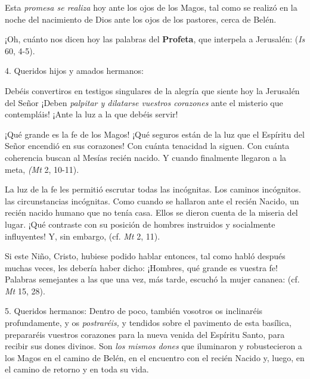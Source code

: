 \begin{body}
					Esta \emph{promesa se realiza} hoy ante los ojos de los Magos, tal como se realizó en la noche del nacimiento de Dios ante los ojos de los pastores, cerca de Belén.
					
					¡Oh, cuánto nos dicen hoy las palabras del \textbf{Profeta}, que interpela a Jerusalén:  (\emph{Is} 60, 4-5).
					
					4. Queridos hijos y amados hermanos:
					
					Debéis convertiros en testigos singulares de la alegría que siente hoy la Jerusalén del Señor ¡Deben \emph{palpitar y dilatarse vuestros corazones} ante el misterio que contempláis! ¡Ante la luz a la que debéis servir!
					
					¡Qué grande es la fe de los Magos! ¡Qué seguros están de la luz que el Espíritu del Señor encendió en sus corazones! Con cuánta tenacidad la siguen. Con cuánta coherencia buscan al Mesías recién nacido. Y cuando finalmente llegaron a la meta,  \emph{(Mt} 2, 10-11).
					
					La luz de la fe les permitió escrutar todas las incógnitas. Los caminos incógnitos. las circunstancias incógnitas. Como cuando se hallaron ante el recién Nacido, un recién nacido humano que no tenía casa. Ellos se dieron cuenta de la miseria del lugar. ¡Qué contraste con su posición de hombres instruidos y socialmente influyentes! Y, sin embargo,  (cf. \emph{Mt} 2, 11).
					
					Si este Niño, Cristo, hubiese podido hablar entonces, tal como habló después muchas veces, les debería haber dicho: ¡Hombres, qué grande es vuestra fe! Palabras semejantes a las que una vez, más tarde, escuchó la mujer cananea:  (cf. \emph{Mt} 15, 28).
					
					5. Queridos hermanos: Dentro de poco, también vosotros os inclinaréis profundamente, y os \emph{postraréis,} y tendidos sobre el pavimento de esta basílica, prepararéis vuestros corazones para la nueva venida del Espíritu Santo, para recibir sus dones divinos. Son \emph{los mismos dones} que iluminaron y robustecieron a los Magos en el camino de Belén, en el encuentro con el recién Nacido y, luego, en el camino de retorno y en toda su vida.
					

\end{body}
